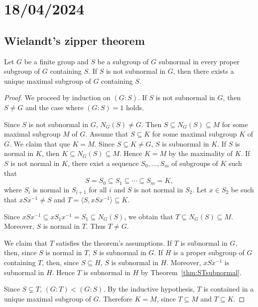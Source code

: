 \section{18/04/2024}

\subsection{Wielandt's zipper theorem}

\begin{theorem}[Wielandt]
	\label{thm:zipper}
	Let $G$ be a finite group and $S$ be a subgroup of $G$ subnormal in every 
    proper subgroup of $G$ containing $S$. If $S$ is not subnormal in $G$, 
    then there exists a unique maximal subgroup of $G$ containing $S$. 
\end{theorem}

\begin{proof}
	We proceed by induction on $(G:S)$. If $S$ is not subnormal in $G$, then 
	$S\ne G$ and the case where $(G:S)=1$ holds. 

	Since $S$ is not subnormal in $G$, $N_G(S)\ne G$. Then $S\subseteq
	N_G(S)\subseteq M$ for some maximal subgroup $M$ of $G$. Assume that 
	$S\subseteq K$ for some maximal subgroup $K$ of $G$. We claim that 
	que $K=M$. Since $S\subseteq K\ne G$, $S$ is subnormal in $K$. If $S$ is 
	normal in $K$, then $K\subseteq N_G(S)\subseteq M$. Hence $K=M$ by the maximality of $K$. 
	If $S$ is not normal in $K$, there exist a sequence 
	$S_0,\dots,S_m$ of subgroups of $K$ such that 
	\[
		S=S_0\subseteq S_1\subseteq\cdots\subseteq S_m=K,
	\]
    where $S_i$ is normal in $S_{i+1}$ for all $i$ and 
	$S$ is not normal in $S_2$. Let $x\in S_2$ be such that $xSx^{-1}\ne S$ and 
	$T=\langle S,xSx^{-1}\rangle\subseteq K$. 

	Since $xSx^{-1}\subseteq xS_1x^{-1}=S_1\subseteq N_G(S)$, we obtain that 
	$T\subseteq N_G(S)\subseteq M$. Moreover, $S$ is normal in $T$. Thus $T\ne G$. 

	We claim that $T$ satisfies the theorem's assumptions. If $T$ is subnormal in $G$, then, since 
	$S$ is normal in $T$, $S$ is subnormal in $G$. If $H$ is a proper subgroup of $G$ 
    containing $T$, then, since 
	$S\subseteq H$, $S$ is subnormal in $H$. Moreover, $xSx^{-1}$ is subnormal in $H$. Hence 
	$T$ is subnormal in $H$ by Theorem~\ref{thm:STsubnormal}.

	Since $S\subsetneq T$, $(G:T)<(G:S)$. By the inductive hypothesis, $T$ is contained in a unique maximal subgroup of $G$. Therefore
	$K=M$, since $T\subseteq M$ and 
	$T\subseteq K$.
\end{proof}

